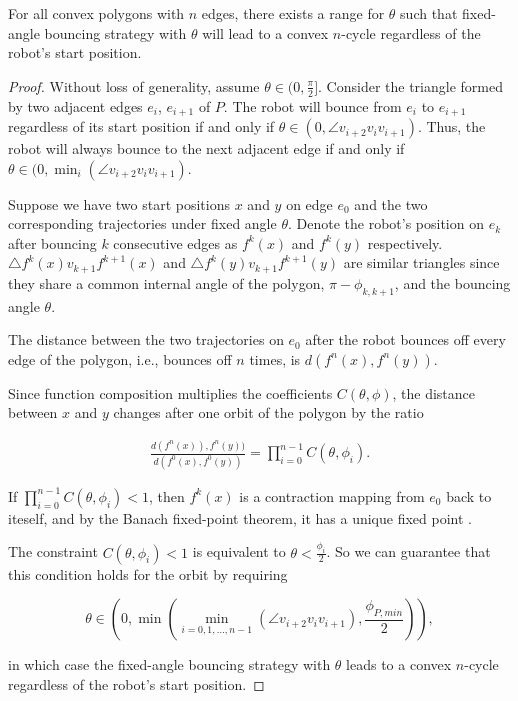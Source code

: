 \documentclass[]{styles/svproc}  %
\begin{document}
\begin{theorem} \label{thm:convex}
For all convex polygons with $n$ edges, there exists a range for $\theta$ such that fixed-angle bouncing strategy with $\theta$ will lead to a convex $n$-cycle regardless of the robot's start position.
\end{theorem}
\begin{proof}
Without loss of generality, assume $\theta \in (0, \frac{\pi}{2}]$. Consider the
triangle formed by two adjacent edges $e_i$, $e_{i+1}$ of $P$. The robot will
bounce from $e_i$ to $e_{i+1}$ regardless of its start position if and only if
$\theta \in (0, \angle v_{i+2}v_{i}v_{i+1})$. Thus, the robot will always bounce
to the next adjacent edge if and only if
$\theta \in (0, \min_{i}(\angle v_{i+2}v_{i}v_{i+1})$.

Suppose we have two start positions $x$ and $y$ on edge $e_0$ and the two
corresponding trajectories under fixed angle $\theta$. Denote the robot's
position on $e_k$ after bouncing $k$ consecutive edges as $f^{k}(x)$ and
$f^{k}(y)$ respectively. $\triangle f^{k}(x)v_{k+1}f^{k+1}(x)$ and
$\triangle f^{k}(y)v_{k+1}f^{k+1}(y)$ are similar triangles since they share a
common internal angle of the polygon, $\pi - \phi_{k,k+1}$, and the bouncing angle
$\theta$.

The distance between the two trajectories on $e_0$ after the robot bounces off
every edge of the polygon, i.e., bounces off $n$ times, is
$d(f^{n}(x), f^{n}(y))$.

Since function composition multiplies the coefficients $C(\theta, \phi)$, 
the distance between $x$ and $y$ changes after one orbit of the polygon by the
ratio

\begin{eqnarray*}
\frac{d(f^{n}(x)), f^{n}(y))}{d(f^{0}(x), f^{0}(y))} = \prod_{i = 0}^{n-1}
C(\theta, \phi_{i}).
\end{eqnarray*}

If $\prod_{i = 0}^{n-1} C(\theta, \phi_{i}) < 1$, then $f^k(x)$ is a contraction
mapping from $e_0$ back to iteself, and by the Banach fixed-point theorem, it
has a unique fixed point \cite{Granas2003}.

The constraint $C(\theta,\phi_{i})<1$ is equivalent to
$\theta < \frac{\phi_{i}}{2}$. So we can guarantee that this condition holds
for the orbit by requiring

\begin{equation*}
\theta \in (0, \min(\min_{i = 0, 1, \dots, n-1}(\angle v_{i+2}v_{i}v_{i+1}),
\frac{\phi_{P,min}}{2})),
\end{equation*}

in which case the fixed-angle bouncing strategy with $\theta$ leads to a convex
$n$-cycle regardless of the robot's start position.
\end{proof}
\end{document}
